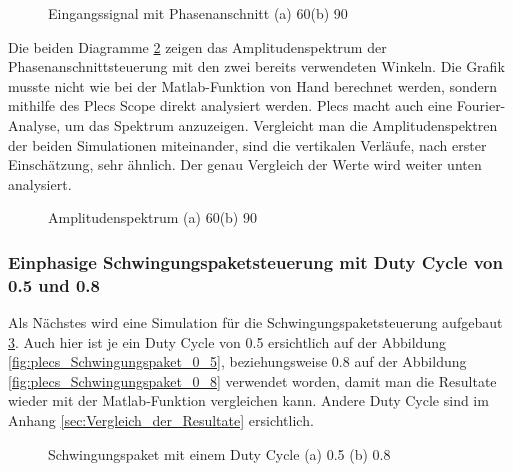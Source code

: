\begin{figure}[ht!]
	\centering
	\qquad
	\caption{Eingangssignal mit Phasenanschnitt (a) 60\textdegree (b) 90\textdegree}
	\label{fig:Eingangssignal simuliert mit Plecs}
\end{figure}

\newpage

Die beiden Diagramme \ref{fig:plecs_Amplitudenspektrum} zeigen das Amplitudenspektrum der Phasenanschnittsteuerung mit den zwei bereits verwendeten Winkeln. Die Grafik musste nicht wie bei der Matlab-Funktion von Hand berechnet werden, sondern mithilfe des Plecs Scope direkt analysiert werden. Plecs macht auch eine Fourier-Analyse, um das Spektrum anzuzeigen. Vergleicht man die Amplitudenspektren der beiden Simulationen miteinander, sind die vertikalen Verläufe, nach erster Einschätzung, sehr ähnlich. Der genau Vergleich der Werte wird weiter unten analysiert.   
     
\begin{figure}[ht!]
	\centering
	\qquad
	\caption{Amplitudenspektrum (a) 60\textdegree (b) 90\textdegree}
	\label{fig:plecs_Amplitudenspektrum}
\end{figure}

\subsubsection{Einphasige Schwingungspaketsteuerung mit Duty Cycle von 0.5 und 0.8}

Als Nächstes wird eine Simulation für die Schwingungspaketsteuerung aufgebaut \ref{fig:plecs_Schwingungspakete}. Auch hier ist je ein Duty Cycle von 0.5 ersichtlich auf der Abbildung \ref{fig:plecs_Schwingungspaket_0_5}, beziehungsweise 0.8 auf der Abbildung \ref{fig:plecs_Schwingungspaket_0_8} verwendet worden, damit man die Resultate wieder mit der Matlab-Funktion vergleichen kann. Andere Duty Cycle sind im Anhang \ref{sec:Vergleich_der_Resultate} ersichtlich. 
\begin{figure}[ht!]
	\centering
	\qquad
	\caption{Schwingungspaket mit einem Duty Cycle (a) 0.5 (b) 0.8}
	\label{fig:plecs_Schwingungspakete}
\end{figure}

